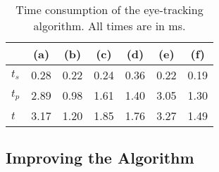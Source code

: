 \begin{table}[tb]
  \begin{center}
    \begin{tabular}{|l||c|c|c|c|c|c|}                      \hline
              & (a)  & (b)  & (c)  & (d)  & (e)  & (f)  \\ \hline\hline
      $t_{s}$ & 0.28 & 0.22 & 0.24 & 0.36 & 0.22 & 0.19 \\ \hline
      $t_{p}$ & 2.89 & 0.98 & 1.61 & 1.40 & 3.05 & 1.30 \\ \hline
      $t$     & 3.17 & 1.20 & 1.85 & 1.76 & 3.27 & 1.49 \\ \hline
    \end{tabular}
  \end{center}
  \caption{\label{tab:time}Time consumption of the {\octopus}
    eye-tracking algorithm.  All times are in ms.}
\end{table}

\subsection{Improving the Algorithm}
\label{algo:eval:improve}

